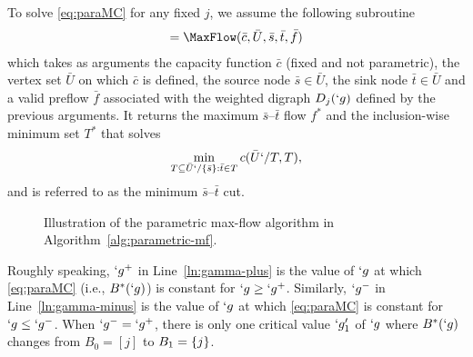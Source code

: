 \documentclass[conference,letterpaper]{IEEEtran}
\begin{document}
To solve \eqref{eq:paraMC} for any fixed $j$, we assume the following subroutine
\begin{align}
	[f^*,T^*]=\MaxFlow(\bar{c},\bar{U},\bar{s},\bar{t},\bar{f})\label{eq:maxflow}
\end{align}
which takes as arguments the capacity
function $\bar{c}$ (fixed and not parametric), the vertex set $\bar{U}$ on which $\bar{c}$ is defined,
the source node $\bar{s}\in \bar{U}$, the sink node $\bar{t}\in \bar{U}$ and a valid preflow $\bar{f}$
associated with the weighted digraph $D_{j}(`g)$ defined by the previous arguments.
It returns the maximum $\bar{s}$--$\bar{t}$ flow $f^*$ and the inclusion-wise minimum set $T^*$ that solves
\begin{align}
	\label{eq:triple-star}
	\min_{T\subseteq \bar{U}`/\{\bar{s}\}: \bar{t}\in T} c(\bar{U}`/T,T),
\end{align}
and is referred to as the minimum $\bar{s}$--$\bar{t}$ cut.

\begin{figure*}
	\begin{center}
		\hfill
		\hfill
	\end{center}
	\caption{Illustration of the parametric max-flow algorithm in Algorithm~\ref{alg:parametric-mf}.}
	\label{fig:eg:barD3}
\end{figure*}

Roughly speaking, $`g^+$ in Line~\ref{ln:gamma-plus} is the value of $`g$ at which
\eqref{eq:paraMC} (i.e., $B^{*}(`g)$) is constant for $`g\geq `g^+$.
Similarly, $`g^-$ in Line~\ref{ln:gamma-minus} is the value of $`g$ at which \eqref{eq:paraMC} is constant for $`g\leq `g^-$.
When $`g^-=`g^+$, there is only one critical value $`g'_1$ of $`g$ where $B^*(`g)$ changes from $B_0=[j]$ to $B_1=\{j\}$. 
\end{document}
